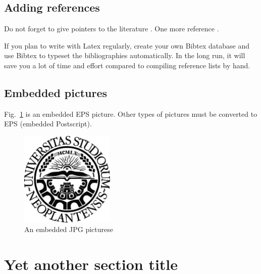 \documentclass[a4paper,12pt]{article}
\begin{document}


\subsection{Adding references}\label{sec:references}

Do not forget to give pointers to the literature
\cite{DifHel76,HarCar98,AbaNee94}.  One more reference
\cite{Amoroso94}.

If you plan to write with Latex regularly, create your own Bibtex
database and use Bibtex to typeset the bibliographies automatically.
In the long run, it will save you a lot of time and effort compared to
compiling reference lists by hand.




\subsection{Embedded pictures}\label{sec:pictures}

Fig.~\ref{fig:mypicture1} is an embedded EPS picture. Other types of pictures must be converted to EPS (embedded Postscript).

\begin{figure}[t]
  \begin{center}
    \includegraphics[width=0.4\textwidth,height=0.4\textheight,keepaspectratio]{NoviSadLogoGray.jpg}
    \caption{An embedded JPG picturese }
    \label{fig:mypicture1}
  \end{center}
\end{figure}





\pagebreak[3]
\section{Yet another section title}
\end{document}
